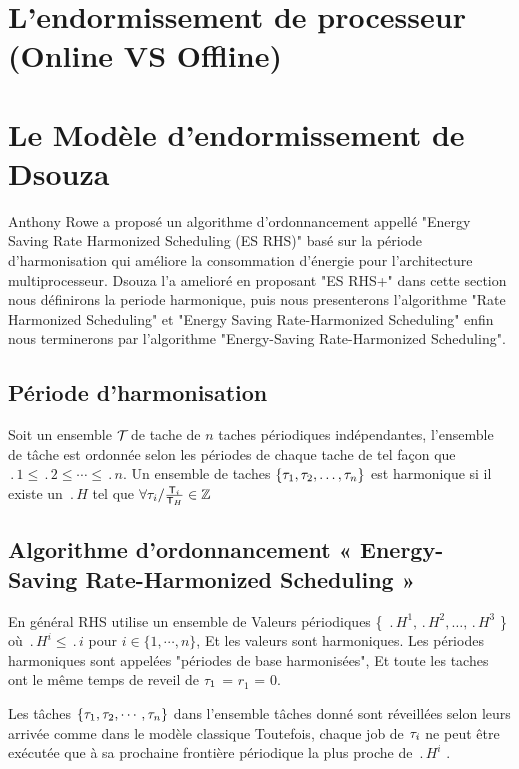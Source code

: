 \section{L'endormissement de processeur (Online VS Offline)}
\section{Le Modèle d'endormissement de Dsouza}
Anthony Rowe a proposé un algorithme d’ordonnancement appellé "Energy
Saving Rate Harmonized Scheduling (ES RHS)" \cite{Rowe10} basé sur la
période d’harmonisation qui améliore la consommation d’énergie pour
l’architecture multiprocesseur.  Dsouza l'a amelioré en proposant "ES
RHS+" dans cette section nous définirons la periode harmonique, puis
nous presenterons l'algorithme "Rate Harmonized Scheduling" et "Energy
Saving Rate-Harmonized Scheduling" enfin nous terminerons par
l'algorithme "Energy-Saving Rate-Harmonized Scheduling".

\subsection{Période d’harmonisation}

Soit un ensemble $\mathcal{T}_{}$ de tache de $n$ taches périodiques
indépendantes, l’ensemble de tâche est ordonnée selon les périodes de
chaque tache de tel façon que $\period{1} \leq \period{2} \leq \cdots
\leq \period{n}$.  Un ensemble de taches $\{\tau_{1}, \tau_{2}, \dots,
\tau_{n} \}$ est harmonique si il existe un $\period{H}$ tel que
$\forall \tau_{i} / \frac{\mathsf{T}_{i}}{\mathsf{T}_{H}} \in \mathbb{Z}$

\subsection{Algorithme d’ordonnancement « Energy-Saving Rate-Harmonized Scheduling »}

En général RHS utilise un ensemble de Valeurs périodiques \{
$\period{H}^1,\period{H}^2,\dots ,\period{H}^3$ \} où $\period{H}^i
\leq \period{i}$ pour $i \in \{1, \cdots, n \}$, Et les valeurs sont
harmoniques. Les périodes harmoniques sont appelées "périodes de base
harmonisées", Et toute les taches ont le même temps de reveil de
$\tau_{1}$ = $r_1$ = 0.

Les tâches $\{\tau_{1}, \tau_{2}, \cdots, \tau_{n} \}$ dans l’ensemble
tâches donné sont réveillées selon leurs arrivée comme dans le modèle
classique Toutefois, chaque job de $\tau_{i}$ ne peut être exécutée
que à sa prochaine frontière périodique la plus proche de
$\period{H}^i$ \cite{Rowe10}.

